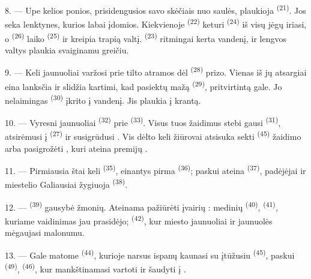 \VUsaut{4.4mm}
\VUsaut{3.4mm}

8. --- Upe kelios ponios, prisidengusios savo skėčiais nuo saulės, plaukioja
 \textsuperscript{(21)}. Jos seka lenktynes, kurios labai įdomios.
Kiekvienoje  \textsuperscript{(22)} keturi 
\textsuperscript{(24)} iš visų jėgų iriasi, o 
\textsuperscript{(26)} laiko  \textsuperscript{(25)} ir kreipia trapią
valtį.  \textsuperscript{(23)} ritmingai kerta vandenį, ir lengvos
valtys plaukia svaiginamu greičiu.

9. --- Keli jaunuoliai varžosi prie tilto atramos dėl 
\textsuperscript{(28)} prizo. Vienas iš jų atsargiai eina lanksčia ir slidžia
kartimi, kad pasiektų mažą  \textsuperscript{(29)}, pritvirtintą
gale. Jo nelaimingas  \textsuperscript{(30)} įkrito į vandenį. Jis
plaukia į krantą.

10. --- Vyresni jaunuoliai  \textsuperscript{(32)}
prie  \textsuperscript{(33)}. Visus tuos žaidimus stebi gausi
 \textsuperscript{(31)}, atsirėmusi į 
\textsuperscript{(27)}  ir susigrūdusi . Vis dėlto
keli žiūrovai atsisuka sekti  \textsuperscript{(45)} žaidimo
arba pasigrožėti , kuri ateina premijų .

11. --- Pirmiausia štai keli  \textsuperscript{(35)}, einantys
pirma  \textsuperscript{(36)}; paskui ateina 
\textsuperscript{(37)}, padėjėjai ir miestelio 
Galiausiai žygiuoja  \textsuperscript{(38)}.

\VUsaut{5.0mm}
\VUsaut{3.6mm}

12. ---  \textsuperscript{(39)} gausybė žmonių. Ateinama
pažiūrėti įvairių : medinių 
\textsuperscript{(40)},  \textsuperscript{(41)}, kuriame vaidinimas jau
prasidėjo;  \textsuperscript{(42)}, kur miesto jaunuoliai ir
jaunuolės mėgaujasi  malonumu.

13. --- Gale matome  \textsuperscript{(44)}, kurioje narsus ispanų
 kaunasi su įtūžusiu  \textsuperscript{(45)}, paskui
 \textsuperscript{(49)},  \textsuperscript{(46)},
kur mankštinamasi vartoti  ir šaudyti į
.

